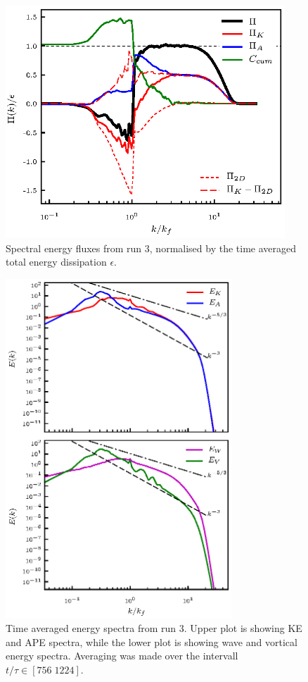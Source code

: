  
\begin{figure}[h]
\centerline{\includegraphics[angle=0,width=10.5cm]{./fig10.eps}}
 \caption{Spectral energy fluxes from run 3, normalised by the time averaged total energy dissipation $ \epsilon $. }
 \label{F2}
 \end{figure}
 

 
 \begin{figure}[h]
\centerline{\includegraphics[angle=0,width=8.5cm]{./fig11.eps}}
 \caption{ Time averaged energy spectra from run 3. Upper plot is showing KE and APE spectra, while the lower plot is showing wave and vortical energy spectra. Averaging was made over the intervall $ t/\tau \in [756 \; 1224] $.}
 \label{S2}
 \end{figure}
 
